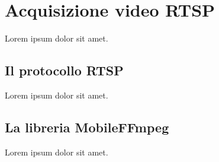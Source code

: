 \chapter{Acquisizione video RTSP}
\label{cha:rtsp}
Lorem ipsum dolor sit amet.

\section{Il protocollo RTSP}
\label{sec:rtsp_protocollo}

Lorem ipsum dolor sit amet.

\section{La libreria MobileFFmpeg}
\label{sec:rtsp_ffmpeg}

Lorem ipsum dolor sit amet.

